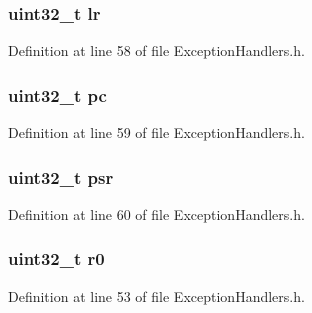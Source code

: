 \subsubsection[{\texorpdfstring{lr}{lr}}]{\setlength{\rightskip}{0pt plus 5cm}uint32\+\_\+t lr}\hypertarget{struct_exception_stack_frame_a6ced3f4007bb60daf12191c058e55b8c}{}\label{struct_exception_stack_frame_a6ced3f4007bb60daf12191c058e55b8c}


Definition at line 58 of file Exception\+Handlers.\+h.

\subsubsection[{\texorpdfstring{pc}{pc}}]{\setlength{\rightskip}{0pt plus 5cm}uint32\+\_\+t pc}\hypertarget{struct_exception_stack_frame_afaa20335217fae16f0e22b466017dae1}{}\label{struct_exception_stack_frame_afaa20335217fae16f0e22b466017dae1}


Definition at line 59 of file Exception\+Handlers.\+h.

\subsubsection[{\texorpdfstring{psr}{psr}}]{\setlength{\rightskip}{0pt plus 5cm}uint32\+\_\+t psr}\hypertarget{struct_exception_stack_frame_a62a4d778a5a6da71db806fc36b6c01f7}{}\label{struct_exception_stack_frame_a62a4d778a5a6da71db806fc36b6c01f7}


Definition at line 60 of file Exception\+Handlers.\+h.

\subsubsection[{\texorpdfstring{r0}{r0}}]{\setlength{\rightskip}{0pt plus 5cm}uint32\+\_\+t r0}\hypertarget{struct_exception_stack_frame_a592a962c55cf82b46c73c892a6e4fd49}{}\label{struct_exception_stack_frame_a592a962c55cf82b46c73c892a6e4fd49}


Definition at line 53 of file Exception\+Handlers.\+h.

